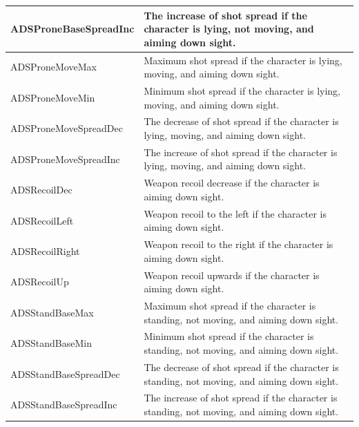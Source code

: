 \documentclass[MGS,Master,english]{twbook}%
\begin{document}
\begin{longtable}[c]{|l|p{10.5cm}|}
	ADSProneBaseSpreadInc  & The increase of shot spread if the character is lying, not moving, and aiming down sight.                                      \\ \hline
	ADSProneMoveMax        & Maximum shot spread if the character is lying, moving, and aiming down sight.                                                  \\ \hline
	ADSProneMoveMin        & Minimum shot spread if the character is lying, moving, and aiming down sight.                                                  \\ \hline
	ADSProneMoveSpreadDec  & The decrease of shot spread if the character is lying, moving, and aiming down sight.                                          \\ \hline
	ADSProneMoveSpreadInc  & The increase of shot spread if the character is lying, moving, and aiming down sight.                                          \\ \hline
	ADSRecoilDec           & Weapon recoil decrease if the character is aiming down sight.                                                                  \\ \hline
	ADSRecoilLeft          & Weapon recoil to the left if the character is aiming down sight.                                                               \\ \hline
	ADSRecoilRight         & Weapon recoil to the right if the character is aiming down sight.                                                              \\ \hline
	ADSRecoilUp            & Weapon recoil upwards if the character is aiming down sight.                                                                   \\ \hline
	ADSStandBaseMax        & Maximum shot spread if the character is standing, not moving, and aiming down sight.                                           \\ \hline
	ADSStandBaseMin        & Minimum shot spread if the character is standing, not moving, and aiming down sight.                                           \\ \hline
	ADSStandBaseSpreadDec  & The decrease of shot spread if the character is standing, not moving, and aiming down sight.                                   \\ \hline
	ADSStandBaseSpreadInc  & The increase of shot spread if the character is standing, not moving, and aiming down sight.                                   \\ \hline

\end{longtable}
\end{document}
